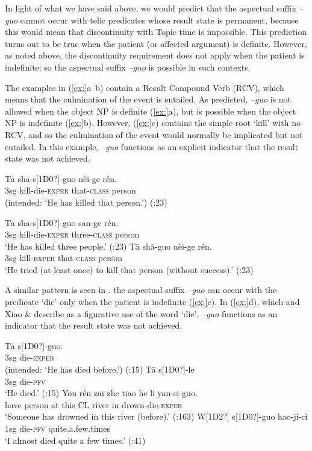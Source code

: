In light of what we have said above, we would predict that the aspectual suffix \textit{–guo} cannot occur with telic predicates whose result state is permanent, because this would mean that discontinuity with Topic time is impossible. This prediction turns out to be true when the patient (or affected argument) is definite. However, as noted above, the discontinuity requirement does not apply when the patient is indefinite; so the aspectual suffix \textit{–guo} is possible in such contexts.



The examples in (\ref{ex:}a--b) contain a Result Compound Verb (RCV), which means that the culmination of the event is entailed. As predicted, \textit{–guo} is not allowed when the object NP is definite (\ref{ex:}a), but is possible when the object NP is indefinite (\ref{ex:}b). However, (\ref{ex:}c) contains the simple root ‘kill’ with no RCV, and so the culmination of the event would normally be implicated but not entailed. In this example, \textit{–guo} functions as an explicit indicator that the result state was not achieved.


\ea
\ea \gll *T\=a  sh\=a-s[1D0?]-guo  nèi-ge  rén.\\
 3sg  kill-die-\textsc{exper}  that-\textsc{class}  person\\
\glt (intended: ‘He has killed that person.’)  (\citealt{Ma1977}:23)

\ex \gll  T\=a  sh\=a-s[1D0?]-guo  s\=an-ge  rén.\\
3sg  kill-die-\textsc{exper}  three-\textsc{class}  person\\
\glt ‘He has killed three people.’  (\citealt{Ma1977}:23)
\ex \gll  T\=a  sh\=a-guo  nèi-ge  rén.\\
3sg  kill-\textsc{exper}  that-\textsc{class}  person\\
\glt ‘He tried (at least once) to kill that person (without success).’  (\citealt{Ma1977}:23)
\z \z


A similar pattern is seen in . the aspectual suffix \textit{–guo} can occur with the predicate ‘die’ only when the patient is indefinite (\ref{ex:}c). In (\ref{ex:}d), which \citet{Chu1998} and Xiao \& \citet{McEnery2004} describe as a figurative use of the word ‘die’, \textit{–guo} functions as an indicator that the result state was not achieved.


\ea
\ea \gll  *T\=a  s[1D0?]-guo.\\
 3sg  die-\textsc{exper}\\
\glt (intended: ‘He has died before.’)  (\citealt{Ma1977}:15)
\ex \gll T\=a  s[1D0?]-le\\
3sg  die-\textsc{pfv}\\
\glt ‘He died.’  (\citealt{Ma1977}:15)
\ex \gll  You  rén  zai  zhe  tiao  he  li  yan-si-guo.\\
have  person  at  this  CL  river  in  drown-die-\textsc{exper}\\
\glt ‘Someone has drowned in this river (before).’  (\citealt{Yeh1996}:163)
\ex \gll  W[1D2?]  s[1D0?]-guo  hao-ji-ci\\
1sg  die-\textsc{pfv} quite.a.few.times\\
\glt ‘I almost died quite a few times.’  (\citealt{Chu1998}:41)
\z \z


